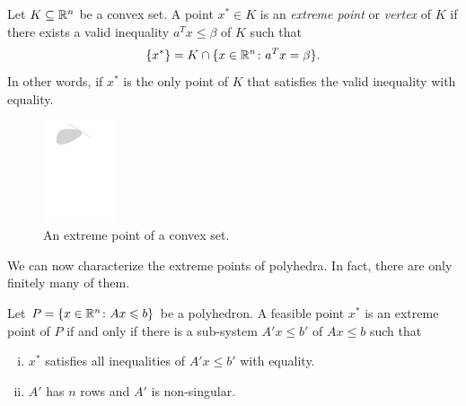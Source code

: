 


\begin{definition}
  Let $K \subseteq \mathbb{R}^n$ be a convex set. A point $x^* \in K$ is an 
 \emph{extreme point} or \emph{vertex} of $K$ if there exists a valid inequality $a^Tx \leq \beta$ of $K$ such that 
 \begin{displaymath}
   \{x^*\} = K \cap \{x \in \mathbb{R}^n \colon a^Tx = \beta\}.  
 \end{displaymath}
In other words, if $x^*$ is the only point of $K$ that satisfies the valid inequality with equality. 
\end{definition}

\begin{figure}
  \centering
  \includegraphics[height=3cm]{figures/ExtremePoint.pdf} 
  \caption{An extreme point of a convex set.}
  \label{fig:5}
\end{figure}

We can now characterize the extreme points of polyhedra. In fact, there are only finitely many of them. 

\begin{theorem}
  \label{thr:1}
  Let $P = \{x \in \mathbb{R}^n \colon Ax \leqslant b\}$ be a polyhedron. A feasible point $x^*$ is an extreme point of $P$ if and only if there is a sub-system $A'x \leq b'$ of  $Ax \leq b$  such that
  \begin{enumerate}[i)]
  \item $x^*$ satisfies all inequalities of $A'x \leq b'$ with
    equality. \label{item:1}
  \item $A'$ has $n$ rows and $A'$ is non-singular. \label{item:2}
  \end{enumerate}  
\end{theorem}


